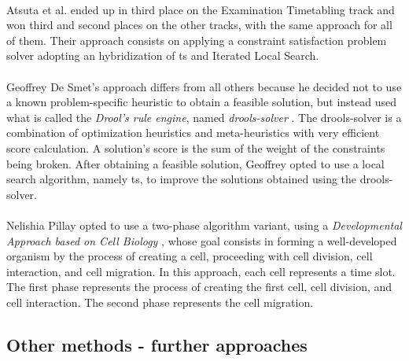 \\
Atsuta et al. ended up in third place on the Examination Timetabling track and won third and second places on the other tracks, with the same approach for all of them. Their approach \cite{Atsuta2007} consists on applying a constraint satisfaction problem solver adopting an hybridization of \gls{ts} and Iterated Local Search.\\
\\
Geoffrey De Smet's approach \cite{Smet2007} differs from all others because he decided not to use a known problem-specific heuristic to obtain a feasible solution, but instead used what is called the \textit{Drool's rule engine}, named \textit{drools-solver} \cite{Drools}. The drools-solver is a combination of optimization heuristics and meta-heuristics with very efficient score calculation. A solution's score is the sum of the weight of the constraints being broken. After obtaining a feasible solution, Geoffrey opted to use a local search algorithm, namely \gls{ts}, to improve the solutions obtained using the drools-solver.\\
\\
Nelishia Pillay opted to use a two-phase algorithm variant, using a \textit{Developmental Approach based on Cell Biology} \cite{Pillay2007}, whose goal consists in forming a well-developed organism by the process of creating a cell, proceeding with cell division, cell interaction, and cell migration. In this approach, each cell represents a time slot. The first phase represents the process of creating the first cell, cell division, and cell interaction. The second phase represents the cell migration.

\subsection{Other methods - further approaches}
\label{subsec:OtherAppr}

